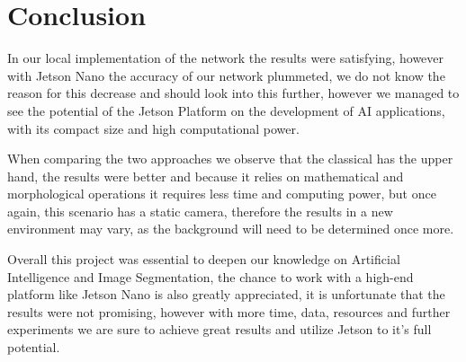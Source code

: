 \documentclass[conference]{IEEEtran}
\begin{document}
\section{Conclusion}

In our local implementation of the network the results were satisfying, however with Jetson Nano the accuracy of our network plummeted, we do not know the reason for this decrease and should look into this further, however we managed to see the potential of the Jetson Platform on the development of AI applications, with its compact size and high computational power.

When comparing the two approaches we observe that the classical has the upper hand, the results were better and because it relies on mathematical and morphological operations it requires less time and computing power, but once again, this scenario has a static camera, therefore the results in a new environment may vary, as the background will need to be determined once more.

Overall this project was essential to deepen our knowledge on Artificial Intelligence and Image Segmentation, the chance to work with a high-end platform like Jetson Nano is also greatly appreciated, it is unfortunate that the results were not promising, however with more time, data, resources and further experiments we are sure to achieve great results and utilize Jetson to it's full potential.
\end{document}
